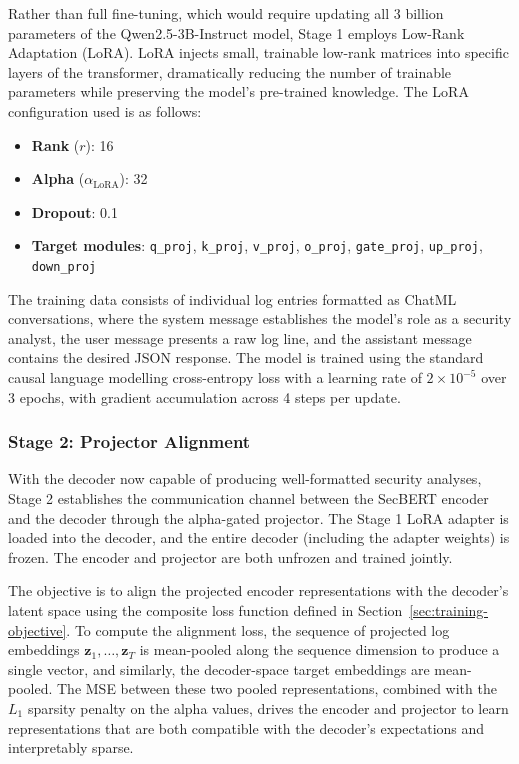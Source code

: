 Rather than full fine-tuning, which would require updating all 3 billion parameters of the Qwen2.5-3B-Instruct model, Stage 1 employs Low-Rank Adaptation (LoRA). LoRA injects small, trainable low-rank matrices into specific layers of the transformer, dramatically reducing the number of trainable parameters while preserving the model's pre-trained knowledge. The LoRA configuration used is as follows:

\begin{itemize}
    \item \textbf{Rank} ($r$): 16
    \item \textbf{Alpha} ($\alpha_{\text{LoRA}}$): 32
    \item \textbf{Dropout}: 0.1
    \item \textbf{Target modules}: \texttt{q\_proj}, \texttt{k\_proj}, \texttt{v\_proj}, \texttt{o\_proj}, \texttt{gate\_proj}, \texttt{up\_proj}, \texttt{down\_proj}
\end{itemize}

The training data consists of individual log entries formatted as ChatML conversations, where the system message establishes the model's role as a security analyst, the user message presents a raw log line, and the assistant message contains the desired JSON response. The model is trained using the standard causal language modelling cross-entropy loss with a learning rate of $2 \times 10^{-5}$ over 3 epochs, with gradient accumulation across 4 steps per update.

\subsubsection{Stage 2: Projector Alignment}

With the decoder now capable of producing well-formatted security analyses, Stage 2 establishes the communication channel between the SecBERT encoder and the decoder through the alpha-gated projector. The Stage 1 LoRA adapter is loaded into the decoder, and the entire decoder (including the adapter weights) is frozen. The encoder and projector are both unfrozen and trained jointly.

The objective is to align the projected encoder representations with the decoder's latent space using the composite loss function defined in Section~\ref{sec:training-objective}. To compute the alignment loss, the sequence of projected log embeddings $\mathbf{z}_1, \ldots, \mathbf{z}_T$ is mean-pooled along the sequence dimension to produce a single vector, and similarly, the decoder-space target embeddings are mean-pooled. The MSE between these two pooled representations, combined with the $L_1$ sparsity penalty on the alpha values, drives the encoder and projector to learn representations that are both compatible with the decoder's expectations and interpretably sparse.

